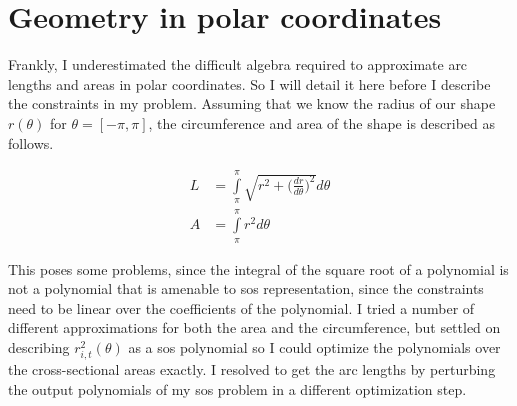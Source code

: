 \section{Geometry in polar coordinates}

Frankly, I underestimated the difficult algebra required to approximate
arc lengths and areas in polar coordinates. So I will detail it here
before I describe the constraints in my problem. Assuming that we
know the radius of our shape $r(\theta)$ for $\theta=[-\pi, \pi]$,
the circumference and area of the shape is described as follows.

\begin{align}
    L & = \int\limits_{\pi}^{\pi} \sqrt{r^2 + \Big(\frac{dr}{d\theta}\Big)^2} d\theta \\
    A & = \int\limits_{\pi}^{\pi} r^2 d\theta
\end{align}

This poses some problems, since the integral of the square root of a polynomial
is not a polynomial that is amenable to \gls{sos} representation, since the
constraints need to be linear over the coefficients of the polynomial.
I tried a number of different approximations for both the area and the circumference, but settled
on describing $r^2_{i,t}(\theta)$ as a \gls{sos} polynomial so I could
optimize the polynomials over the cross-sectional areas exactly. I resolved to
get the arc lengths by perturbing the output polynomials of my \gls{sos} problem
in a different optimization step.
